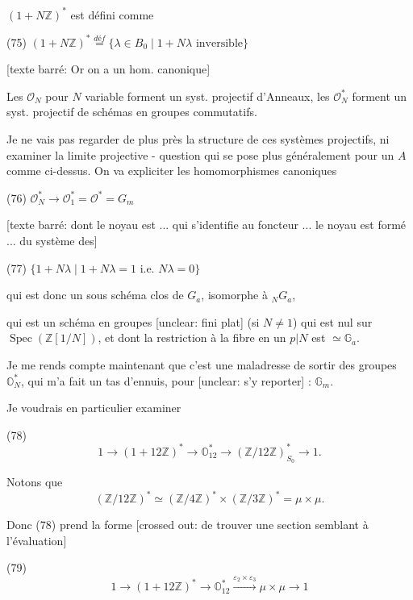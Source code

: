 \newpage


$(1+N\mathbb{Z})^*$ est défini comme

(75) $(1+N\mathbb{Z})^* \stackrel{déf}{=} \{ \lambda \in B_0 \mid 1+N\lambda \text{ inversible} \}$

[texte barré: Or on a un hom. canonique]

Les $\mathcal{O}_N$ pour $N$ variable forment
un syst. projectif d'Anneaux,
les $\mathcal{O}_N^*$ forment un syst. projectif
de schémas en groupes commutatifs.

Je ne vais pas regarder de plus
près la structure de ces systèmes
projectifs, ni examiner la limite
projective - question qui se pose
plus généralement pour un
$A$ comme ci-dessus. On va
expliciter les homomorphismes canoniques

(76) $\mathcal{O}_N^* \to \mathcal{O}_1^* = \mathcal{O}^* = G_m$

[texte barré: dont le noyau est ... qui s'identifie au foncteur ... le noyau est formé ... du système des]

(77) $\{ 1+N\lambda \mid 1+N\lambda=1 \text{ i.e. } N\lambda=0 \}$

qui est donc un sous schéma clos de $G_a$, isomorphe à ${}_N G_a$,

\newpage


qui est un schéma en groupes [unclear: fini plat]
(si $N \neq 1$) qui est nul sur $\operatorname{Spec}(\mathbb{Z}[1/N])$,
et dont la restriction à la fibre en
un $p | N$ est $\simeq \mathbb{G}_a$.

Je me rends compte maintenant
que c'est une maladresse de sortir des
groupes $\mathbb{O}_N^\ast$, qui m'a fait un tas
d'ennuis, pour [unclear: s'y reporter] : $\mathbb{G}_m$.

Je voudrais en particulier examiner

(78) $$1 \longrightarrow (1+12\mathbb{Z})^\ast \longrightarrow \mathbb{O}_{12}^\ast \longrightarrow (\mathbb{Z}/12\mathbb{Z})^\ast_{S_0} \longrightarrow 1 .$$

Notons que
$$(\mathbb{Z}/12\mathbb{Z})^\ast \simeq (\mathbb{Z}/4\mathbb{Z})^\ast \times (\mathbb{Z}/3\mathbb{Z})^\ast = \mu \times \mu .$$

Donc (78) prend la forme
[crossed out: de trouver une section semblant à l'évaluation]

(79) $$1 \longrightarrow (1+12\mathbb{Z})^\ast \longrightarrow \mathbb{O}_{12}^\ast \xrightarrow{\varepsilon_2 \times \varepsilon_3} \mu \times \mu \longrightarrow 1$$

